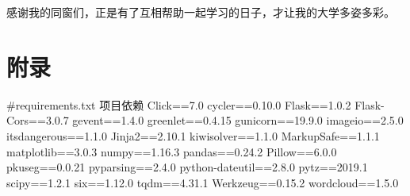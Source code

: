 \documentclass[UTF8,zihao=-4]{ctexart}
\begin{document}
	感谢我的同窗们，正是有了互相帮助一起学习的日子，才让我的大学多姿多彩。

\newpage
\appendix
\section{附录}
\begin{python}
#requirements.txt 项目依赖
Click==7.0
cycler==0.10.0
Flask==1.0.2
Flask-Cors==3.0.7
gevent==1.4.0
greenlet==0.4.15
gunicorn==19.9.0
imageio==2.5.0
itsdangerous==1.1.0
Jinja2==2.10.1
kiwisolver==1.1.0
MarkupSafe==1.1.1
matplotlib==3.0.3
numpy==1.16.3
pandas==0.24.2
Pillow==6.0.0
pkuseg==0.0.21
pyparsing==2.4.0
python-dateutil==2.8.0
pytz==2019.1
scipy==1.2.1
six==1.12.0
tqdm==4.31.1
Werkzeug==0.15.2
wordcloud==1.5.0
\end{python}
\end{document}

